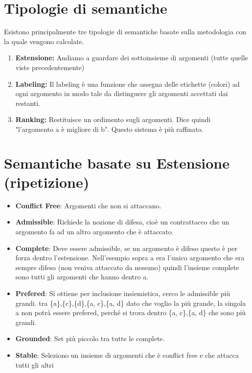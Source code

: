     \section{Tipologie di semantiche}
    Esistono principalmente tre tipologie di semantiche basate sulla metodologia
    con la quale vengono calcolate.
    \begin{enumerate}
        \item \textbf{Estensione:} Andiamo a guardare dei sottoinsieme di
              argomenti (tutte quelle viste precedentemente)
        \item \textbf{Labeling:} Il labeling è una funzione che assegna delle
              etichette (colori) ad ogni argomento in modo tale da distinguere gli
              argomenti accettati dai restanti.
        \item \textbf{Ranking:} Restituisce un ordimento sugli argomenti. Dice
              quindi "l'argomento a è migliore di b". Questo sistema è più raffinato.
    \end{enumerate}
    \section{Semantiche basate su Estensione (ripetizione)}
    \begin{itemize}
        \item \textbf{Conflict Free}: Argomenti che non si attaccano.
        \item \textbf{Admissible}: Richiede la nozione di difesa, cioè un
              contrattacco che un argomento fa ad un altro argomento che è attaccato.
        \item \textbf{Complete}: Deve essere admissible, se un argomento è
              difeso questo è per forza dentro l'estensione. Nell'esempio sopra a era
              l'unico argomento che era sempre difeso (non veniva attaccato da
              nessuno) quindi l'insieme complete sono tutti gli argomenti che hanno
              dentro a.
        \item \textbf{Prefered}: Si ottiene per inclusione insiemistica, cerco
              le admissible più grandi. tra \{a\},\{c\},\{d\},\{a, c\},\{a, d\} dato
              che voglio la più grande, la singola {a} non potrà essere prefered,
              perché si trova dentro \{a, c\},\{a, d\} che sono più grandi.
        \item \textbf{Grounded}: Set più piccolo tra tutte le complete.
        \item \textbf{Stable}: Seleziono un insieme di argomenti che è conflict
              free e che attacca tutti gli altri
    \end{itemize}

